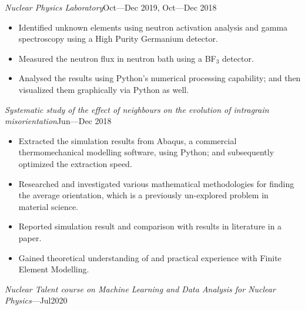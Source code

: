 \documentclass[a4paper, 12pt]{article}
\newcommand{\expentry}[3]{\emph{#1}\hfill{#2}---{#3}}
\begin{document}
\expentry{Nuclear Physics Laboratory}{Oct}{Dec 2019, Oct---Dec 2018}
    \begin{itemize}
    \setlength\itemsep{0em}
    \item Identified unknown elements using neutron activation analysis and gamma spectroscopy using a High Purity Germanium detector.
    \item Measured the neutron flux in neutron bath using a BF$_3$ detector.
    \item Analysed the results using Python’s numerical processing capability; and then visualized them graphically via Python as well.
    \end{itemize}
\begin{adjustwidth}{-0.5cm}{-1.2cm} %
\expentry{Systematic study of the effect of neighbours on the evolution of intragrain misorientation}{Jun}{Dec 2018}
\end{adjustwidth}
    \begin{itemize}
    \setlength\itemsep{0em}
    \item Extracted the simulation results from Abaqus, a commercial thermomechanical modelling software, using Python; and subsequently optimized the extraction speed.
    \item Researched and investigated various mathematical methodologies for finding the average orientation, which is a previously un-explored problem in material science.
    \item Reported simulation result and comparison with results in literature in a paper.
    \item Gained theoretical understanding of and practical experience with Finite Element Modelling.
    \end{itemize}
\expentry{Nuclear Talent course on Machine Learning and Data Analysis for Nuclear Physics}{}{Jul2020}
\end{document}
